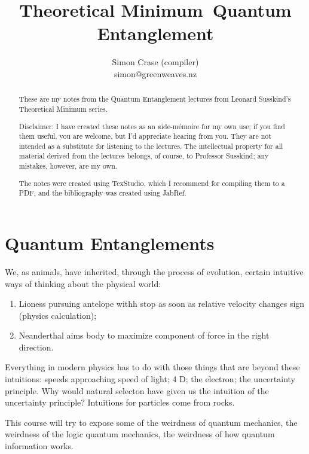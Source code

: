 \documentclass[]{article}
\title{Theoretical Minimum\ Quantum Entanglement}
\author{Simon Crase (compiler)\\simon@greenweaves.nz}
\begin{document}
\maketitle

\begin{abstract}
These are my notes from the Quantum Entanglement lectures\cite{susskind2013entanglement}  from Leonard Susskind's Theoretical Minimum series\cite{susskind2007theoretical}.

Disclaimer: I have created these notes as an aide-m\'emoire for my own use; if you find them useful, you are welcome, but I'd appreciate hearing from you. They are not intended 
as a substitute for listening to the lectures. The intellectual property for all material derived from the lectures belongs, of course, to Professor Susskind; any mistakes, however, are my own.

The notes were created using TexStudio\cite{TexStudio}, which I recommend for compiling them to a PDF, and the bibliography was created using JabRef\cite{Jabref}.

\end{abstract}

\tableofcontents
\listoffigures
\listoftables
\listoftheorems


\section{Quantum Entanglements}


We, as animals, have inherited, through the process of evolution, certain intuitive ways of thinking about the physical world:
\begin{enumerate}
	\item Lioness pursuing antelope withh stop as soon as relative velocity changes sign (physics calculation);
	\item Neanderthal aims body to maximize component of force in the right direction.
\end{enumerate}

Everything in modern physics has to do with those things that are beyond these intuitions:
speeds approaching speed of light; 4 D; the electron; the uncertainty principle. Why would natural selecton have given us the intuition of the uncertainty principle? Intuitions for particles come from rocks.

This course will try to expose some of the weirdness of quantum mechanics, the weirdness of the logic quantum mechanics, the weirdness of how quantum information works. 
\end{document}
